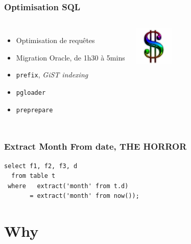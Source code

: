 \documentclass{beamer}
\begin{document}
\begin{frame}[fragile]
  \frametitle{Optimisation SQL}

  \vfill

\begin{columns}[c]

  \begin{itemize}
  \item Optimisation de requêtes
  \item Migration Oracle, de 1h30 à 5mins
  \item \texttt{prefix}, \textit{GiST indexing}
  \item \texttt{pgloader}
  \item \texttt{preprepare}
  \end{itemize}

\begin{center}
  \includegraphics[height=5em]{Dollar-sign.jpg}
\end{center}
\end{columns}
\end{frame}

\begin{frame}[fragile]
  \frametitle{Extract Month From date, THE HORROR}

  \vfill

\begin{verbatim}
select f1, f2, f3, d
  from table t
 where   extract('month' from t.d)
       = extract('month' from now());
\end{verbatim}
\end{frame}

\section{Why}
\end{document}
